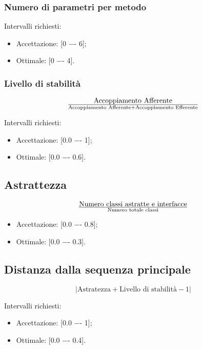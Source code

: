 \subsubsection{Numero di parametri per metodo}
Intervalli richiesti:
\begin{itemize}
\item
Accettazione: [0 −- 6];
\item
Ottimale: [0 −- 4].
\end{itemize}

\subsubsection{Livello di stabilità}

\begin{displaymath}
{\text{Accoppiamento Afferente}}\over{\text{Accoppiamento Afferente} + \text{Accoppiamento Efferente}}
\end{displaymath}

Intervalli richiesti:
\begin{itemize}
\item
Accettazione: [0.0 −- 1];
\item
Ottimale: [0.0 −- 0.6].
\end{itemize}

\subsection{Astrattezza}

\begin{displaymath}
{\text{Numero classi astratte e interfacce}}\over{\text{Numero totale classi}}
\end{displaymath}

\begin{itemize}
\item
Accettazione: [0.0 −- 0.8];
\item
Ottimale: [0.0 −- 0.3].
\end{itemize}

\subsection{Distanza dalla sequenza principale}

\begin{displaymath}
{|\text{Astratezza} + \text{Livello di stabilità} - 1|}
\end{displaymath}

Intervalli richiesti:
\begin{itemize}
\item
Accettazione: [0.0 −- 1];
\item
Ottimale: [0.0 −- 0.4].
\end{itemize}


